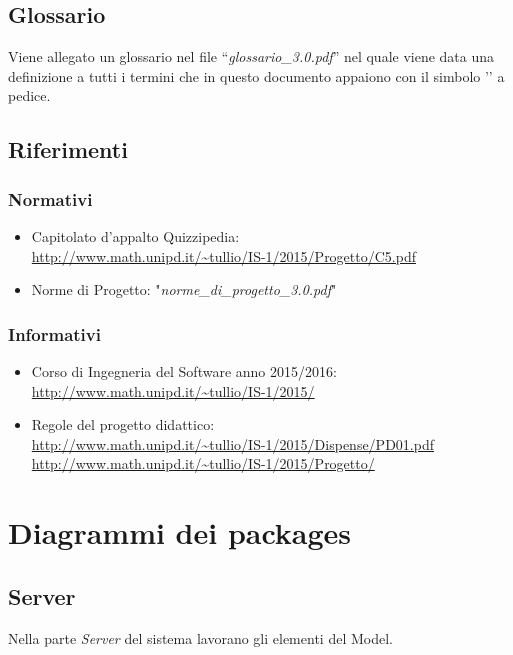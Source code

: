 \documentclass[a4paper,11pt]{article}
\begin{document}
	\subsection{Glossario}
	Viene allegato un glossario nel file ``\textit{glossario\_3.0.pdf}'' nel quale viene data una definizione a tutti i termini che in questo documento appaiono con il simbolo '\addglos' a pedice.
	\subsection{Riferimenti}
		\subsubsection{Normativi}

		\begin{itemize}
			\item Capitolato d'appalto Quizzipedia:\\
			\url{http://www.math.unipd.it/~tullio/IS-1/2015/Progetto/C5.pdf}
			\item Norme di Progetto: "\textit{norme\_di\_progetto\_3.0.pdf}"
		\end{itemize}
		\subsubsection{Informativi}
		\begin{itemize}
			\item Corso di Ingegneria del Software anno 2015/2016:\\
			\url{http://www.math.unipd.it/~tullio/IS-1/2015/}
			\item Regole del progetto didattico:\\
			\url{http://www.math.unipd.it/~tullio/IS-1/2015/Dispense/PD01.pdf}
			\url{http://www.math.unipd.it/~tullio/IS-1/2015/Progetto/}\\
			\end{itemize}
	\pagebreak
	\newpage

		
	
	
	
	\section{Diagrammi dei packages}
		\subsection{Server}
		Nella parte \emph{Server} del sistema lavorano gli elementi del Model.
			
\end{document}
